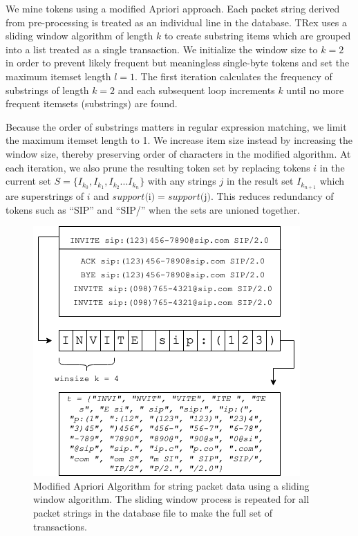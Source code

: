 We mine tokens using a modified Apriori approach. Each packet string derived from pre-processing is treated as an individual line in the database. TRex uses a sliding window algorithm of length $k$ to create substring items which are grouped into a list treated as a single transaction. We initialize the window size to $k=2$ in order to prevent likely frequent but meaningless single-byte tokens and set the maximum itemset length $l=1$. The first iteration calculates the frequency of substrings of length $k=2$ and each subsequent loop increments $k$ until no more frequent itemsets (substrings) are found.

Because the order of substrings matters in regular expression matching, we limit the maximum itemset length to 1. We increase item size instead by increasing the window size, thereby preserving order of characters in the modified algorithm. At each iteration, we also prune the resulting token set by replacing tokens $i$ in the current set $S = \{I_{k_{0}}, I_{k_{1}}, I_{k_{2}}...I_{k_{n}}\}$ with any strings $j$ in the result set $I_{k_{n+1}}$ which are superstrings of $i$ and $ support\text{(i)} = support\text{(j)}$. This reduces redundancy of tokens such as ``SIP'' and ``SIP/'' when the sets are unioned together.

\begin{figure}[hbt!]
  \begin{center}
    \includegraphics[width=0.7\columnwidth]{chapters/3/img/slidingwindow.png}
    \caption{Modified Apriori Algorithm for string packet data using a sliding window algorithm. The sliding window process is repeated for all packet strings in the database file to make the full set of transactions.}
    \label{f:slidingwindow}
  \end{center}
\end{figure}

